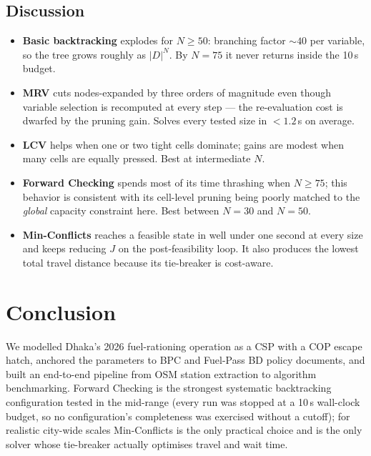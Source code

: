 \documentclass[11pt,a4paper]{article}
\begin{document}


\subsection{Discussion}
\begin{itemize}[leftmargin=*]
  \item \textbf{Basic backtracking} explodes for $N\ge 50$: branching factor
        $\sim 40$ per variable, so the tree grows roughly as $|D|^N$. By
        $N{=}75$ it never returns inside the 10\,s budget.
  \item \textbf{MRV} cuts nodes-expanded by three orders of magnitude even
        though variable selection is recomputed at every step --- the
        re-evaluation cost is dwarfed by the pruning gain. Solves every tested
        size in $<1.2$\,s on average.
  \item \textbf{LCV} helps when one or two tight cells dominate; gains are
        modest when many cells are equally pressed. Best at intermediate $N$.
  \item \textbf{Forward Checking} spends most of its time thrashing when
        $N\ge 75$; this behavior is consistent with its cell-level pruning
        being poorly matched to the \emph{global} capacity constraint here.
        Best between $N{=}30$ and $N{=}50$.
  \item \textbf{Min-Conflicts} reaches a feasible state in well under one
        second at every size and keeps reducing $J$ on the post-feasibility
        loop. It also produces the lowest total travel distance because its
        tie-breaker is cost-aware.
\end{itemize}

\section{Conclusion}

We modelled Dhaka's 2026 fuel-rationing operation as a CSP with a COP escape
hatch, anchored the parameters to BPC and Fuel-Pass BD policy documents, and
built an end-to-end pipeline from OSM station extraction to algorithm
benchmarking. Forward Checking is the strongest systematic backtracking
configuration tested in the mid-range (every run was stopped at a 10\,s
wall-clock budget, so no configuration's completeness was exercised without
a cutoff); for realistic city-wide scales Min-Conflicts is the only
practical choice and is the only solver whose tie-breaker actually optimises
travel and wait time.
\end{document}
